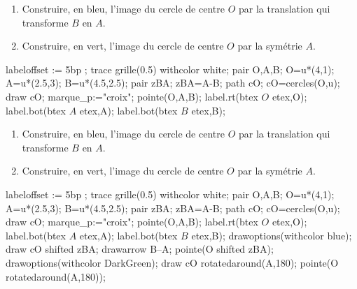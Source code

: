 \begin{exercice*}
    \begin{enumerate}
        \item Construire, en bleu, l'image du cercle de centre $O$ par la translation qui transforme $B$ en $A$.
        \item Construire, en vert, l'image du cercle de centre $O$ par la symétrie $A$.
    \end{enumerate}    
    \begin{Geometrie}[CoinHD={(6u,7u)}]
        labeloffset := 5bp ;
        trace grille(0.5) withcolor white;
        pair O,A,B;
        O=u*(4,1);
        A=u*(2.5,3);
        B=u*(4.5,2.5);
        pair zBA;
        zBA=A-B;
        path cO;
        cO=cercles(O,u);
        draw cO;
        marque_p:="croix";
        pointe(O,A,B);
        label.rt(btex $O$ etex,O);        
        label.bot(btex $A$ etex,A);
        label.bot(btex $B$ etex,B);
    \end{Geometrie}
\end{exercice*}
\begin{corrige}
    \begin{enumerate}
        \item Construire, en bleu, l'image du cercle de centre $O$ par la translation qui transforme $B$ en $A$.
        \item Construire, en vert, l'image du cercle de centre $O$ par la symétrie $A$.
    \end{enumerate}
    \medskip
    \begin{Geometrie}[CoinHD={(6u,7u)}]
        labeloffset := 5bp ;
        trace grille(0.5) withcolor white;
        pair O,A,B;
        O=u*(4,1);
        A=u*(2.5,3);
        B=u*(4.5,2.5);
        pair zBA;
        zBA=A-B;
        path cO;
        cO=cercles(O,u);
        draw cO;
        marque_p:="croix";
        pointe(O,A,B);
        label.rt(btex $O$ etex,O);        
        label.bot(btex $A$ etex,A);
        label.bot(btex $B$ etex,B);
        drawoptions(withcolor blue);
        draw cO shifted zBA;
        drawarrow B--A;
        pointe(O shifted zBA);
        drawoptions(withcolor DarkGreen);
        draw cO rotatedaround(A,180);
        pointe(O rotatedaround(A,180));
    \end{Geometrie}
\end{corrige}

